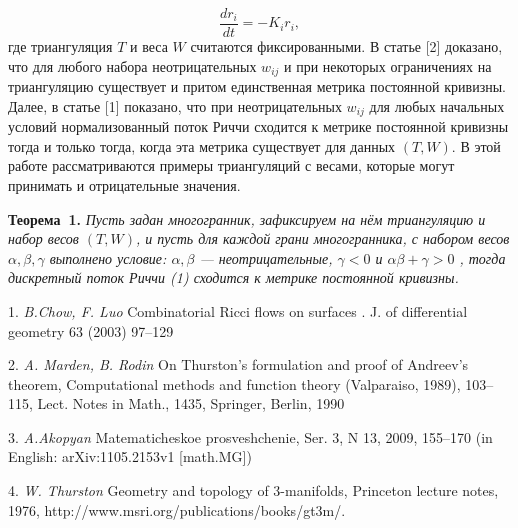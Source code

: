 $$
\dfrac{dr_i}{dt} = -K_i r_i,
$$
где триангуляция $T$ и веса $W$ считаются
фиксированными.
\newline
В статье [2] доказано, что для любого
набора неотрицательных
$w_{ij}$ и при некоторых ограничениях на
триангуляцию существует и
притом единственная метрика постоянной
кривизны. Далее, в статье [1]
показано, что при неотрицательных $w_{ij}$
для любых начальных
условий нормализованный поток Риччи
сходится к метрике постоянной
кривизны тогда и только тогда, когда эта
метрика существует для
данных $(T, W)$.
\newline
В этой работе рассматриваются примеры
триангуляций с весами, которые
могут принимать и отрицательные
значения.

\textbf{Теорема~1.} {\it Пусть задан многогранник, зафиксируем на нём триангуляцию и набор весов $(T, W)$, и пусть для каждой грани многогранника, с набором весов $ \alpha, \beta, \gamma $ выполнено условие: $\alpha, \beta$ --- неотрицательные, $\gamma < 0$ и $ \alpha \beta + \gamma > 0 $ , тогда дискретный поток Риччи (1) сходится к метрике постоянной кривизны.}

%

\litlist

1. {\it B.Chow, F. Luo} Combinatorial Ricci flows on surfaces . J. of differential geometry 63 (2003) 97–129

2. {\it A. Marden, B. Rodin} On Thurston’s formulation and proof of Andreev’s theorem, Computational methods and function theory (Valparaiso, 1989), 103–115, Lect. Notes in Math., 1435, Springer, Berlin, 1990

3. {\it A.Akopyan  } Matematicheskoe prosveshchenie, Ser. 3, N 13, 2009, 155–170 (in English: arXiv:1105.2153v1 [math.MG])

4. {\it W. Thurston } Geometry and topology of 3-manifolds, Princeton lecture notes, 1976, http://www.msri.org/publications/books/gt3m/.